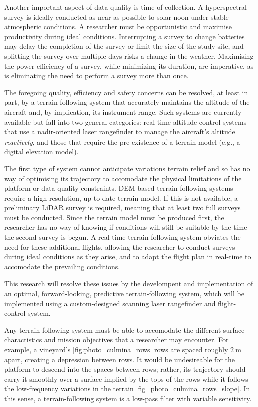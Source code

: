 Another important aspect of data quality is time-of-collection. A hyperspectral survey is ideally conducted as near as possible to solar noon under stable atmospheric conditions. A researcher must be opportunistic and maximise productivity during ideal conditions. Interrupting a survey to change batteries may delay the completion of the survey or limit the size of the study site, and splitting the survey over multiple days risks a change in the weather. Maximising the power efficiency of a survey, while minimizing its duration, are imperative, as is eliminating the need to perform a survey more than once.


The foregoing quality, efficiency and safety concerns can be resolved, at least in part, by a terrain-following system that accurately maintains the altitude of the aircraft and, by implication, its instrument range. Such systems are currently available but fall into two general categories: real-time altitude-control systems that use a nadir-oriented laser rangefinder to manage the aircraft's altitude \emph{reactively}, and those that require the pre-existence of a terrain model (e.g., a digital elevation model).

The first type of system cannot anticipate variations terrain relief and so has no way of optimising its trajectory to accomodate the physical limitations of the platform or data quality constraints. DEM-based terrain following systems require a high-resolution, up-to-date terrain model. If this is not available, a preliminary LiDAR survey is required, meaning that at least two full surveys must be conducted. Since the terrain model must be produced first, the researcher has no way of knowing if conditions will still be suitable by the time the second survey is begun. A real-time terrain following system obviates the need for these additional flights, allowing the researcher to conduct surveys during ideal conditions as they arise, and to adapt the flight plan in real-time to accomodate the prevailing conditions.

This research will resolve these issues by the develompent and implementation of an optimal, forward-looking, predictive terrain-following system, which will be implemented using a custom-designed scanning laser rangefinder and flight-control system.



Any terrain-following system must be able to accomodate the different surface charactistics and mission objectives that a researcher may encounter. For example, a vineyard's \ref{fig:photo_culmina_rows} rows are spaced roughly $\SI{2}\m$ apart, creating a depression between rows. It would be undesireable for the platform to descend into the spaces between rows; rather, its trajectory should carry it smoothly over a surface implied by the tops of the rows while it follows the low-frequency variations in the terrain \ref{fig_photo_culmina_rows_slope}. In this sense, a terrain-following system is a low-pass filter with variable sensitivity.

